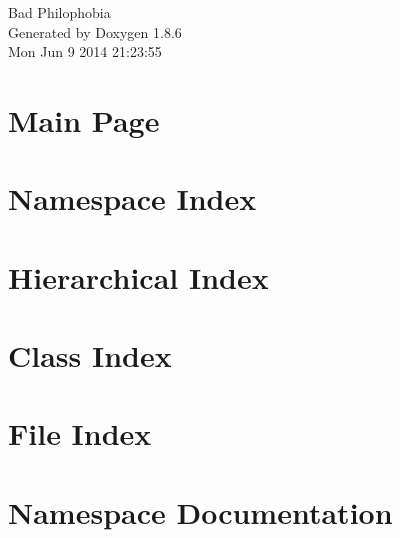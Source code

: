 \documentclass[twoside]{book}
\newcommand{\clearemptydoublepage}{%
  \newpage{\pagestyle{empty}\cleardoublepage}%
}
\begin{document}
\hypersetup{pageanchor=false}
\begin{titlepage}
\vspace*{7cm}
\begin{center}%
{\Large Bad Philophobia }\\
\vspace*{1cm}
{\large Generated by Doxygen 1.8.6}\\
\vspace*{0.5cm}
{\small Mon Jun 9 2014 21:23:55}\\
\end{center}
\end{titlepage}
\clearemptydoublepage
\tableofcontents
\clearemptydoublepage
{}
\hypersetup{pageanchor=true}

\chapter{Main Page}
\label{index}\hypertarget{index}{}
\chapter{Namespace Index}

\chapter{Hierarchical Index}

\chapter{Class Index}

\chapter{File Index}

\chapter{Namespace Documentation}









\end{document}
